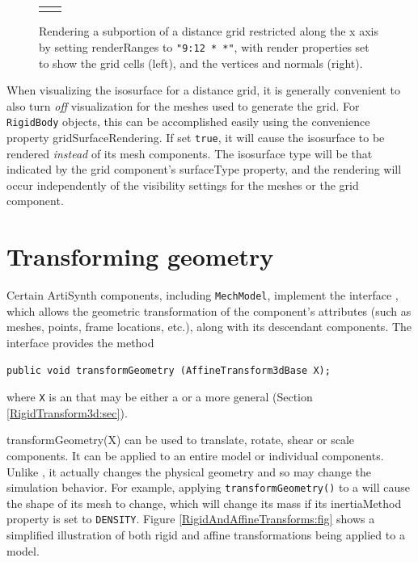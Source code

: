 \begin{figure}[ht]
\begin{center}
\begin{tabular}{cc}
    \fi
  \end{tabular}
\end{center}
\caption{Rendering a subportion of a distance grid
restricted along the x axis by setting {\sf renderRanges} 
to {\tt "9:12 * *"}, with render properties set to show the grid cells
(left), and the vertices and normals (right).}
\label{rigidBodySubGrid:fig}
\end{figure}

When visualizing the isosurface for a distance grid, it is generally
convenient to also turn {\it off} visualization for the meshes used to
generate the grid. For {\tt RigidBody} objects, this can be
accomplished easily using the convenience property {\sf
gridSurfaceRendering}. If set {\tt true}, it will cause the
isosurface to be rendered {\it instead} of its mesh components.  The
isosurface type will be that indicated by the grid component's {\sf
surfaceType} property, and the rendering will occur independently of
the visibility settings for the meshes or the grid component.

\section{Transforming geometry}
\label{TransformingGeometry:sec}

Certain ArtiSynth components, including {\tt MechModel}, implement the
interface ,
which allows the geometric transformation of the component's
attributes (such as meshes, points, frame locations, etc.), along with
its descendant components. The interface provides the method
%
\begin{lstlisting}[]
   public void transformGeometry (AffineTransform3dBase X);
\end{lstlisting}
%
where {\tt X} is an 
that may be either a  or a
more general  (Section
\ref{RigidTransform3d:sec}).

%
{transformGeometry(X)}
can be used to translate, rotate, shear or scale components. It
can be applied to an entire model or individual components. Unlike
, it
actually changes the physical geometry and so may change the
simulation behavior. For example, applying {\tt transformGeometry()}
to a  will cause the
shape of its mesh to change, which will change its mass if its {\sf
inertiaMethod} property is set to {\tt DENSITY}.
Figure \ref{RigidAndAffineTransforms:fig} shows a simplified
illustration of both rigid and affine transformations being applied to
a model.

